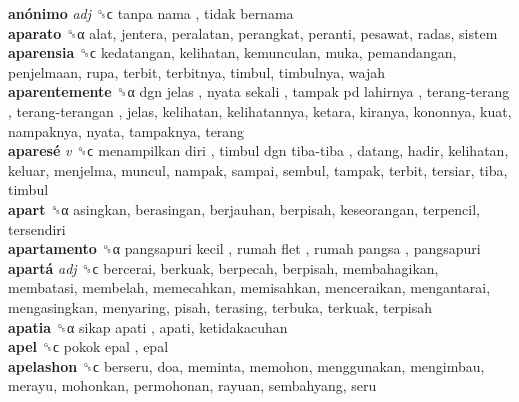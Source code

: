 \textbf{anónimo} \emph{adj}  ␝ϲ   tanpa nama ,  tidak bernama   \\
\textbf{aparato} ␝α  alat, jentera, peralatan, perangkat, peranti, pesawat, radas, sistem  \\
\textbf{aparensia} ␝ϲ  kedatangan, kelihatan, kemunculan, muka, pemandangan, penjelmaan, rupa, terbit, terbitnya, timbul, timbulnya, wajah  \\
\textbf{aparentemente} ␝α   dgn jelas ,  nyata sekali ,  tampak pd lahirnya ,  terang-terang ,  terang-terangan , jelas, kelihatan, kelihatannya, ketara, kiranya, kononnya, kuat, nampaknya, nyata, tampaknya, terang  \\
\textbf{aparesé} \emph{v}  ␝ϲ   menampilkan diri ,  timbul dgn tiba-tiba , datang, hadir, kelihatan, keluar, menjelma, muncul, nampak, sampai, sembul, tampak, terbit, tersiar, tiba, timbul  \\
\textbf{apart} ␝α  asingkan, berasingan, berjauhan, berpisah, keseorangan, terpencil, tersendiri  \\
\textbf{apartamento} ␝α   pangsapuri kecil ,  rumah flet ,  rumah pangsa , pangsapuri  \\
\textbf{apartá} \emph{adj}  ␝ϲ  bercerai, berkuak, berpecah, berpisah, membahagikan, membatasi, membelah, memecahkan, memisahkan, menceraikan, mengantarai, mengasingkan, menyaring, pisah, terasing, terbuka, terkuak, terpisah  \\
\textbf{apatia} ␝α   sikap apati , apati, ketidakacuhan  \\
\textbf{apel} ␝ϲ   pokok epal , epal  \\
\textbf{apelashon} ␝ϲ  berseru, doa, meminta, memohon, menggunakan, mengimbau, merayu, mohonkan, permohonan, rayuan, sembahyang, seru  \\
